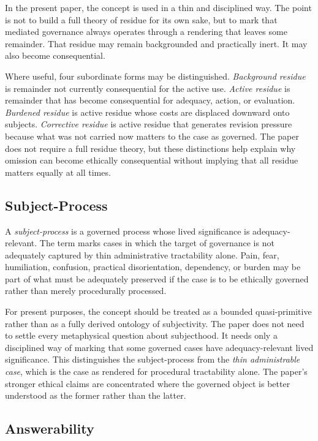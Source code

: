 \documentclass[11pt]{article}
\renewcommand{\emph}[1]{\textit{#1}}
\begin{document}
In the present paper, the concept is used in a thin and disciplined way. The point is not to build a full theory of residue for its own sake, but to mark that mediated governance always operates through a rendering that leaves some remainder. That residue may remain backgrounded and practically inert. It may also become consequential.

Where useful, four subordinate forms may be distinguished. \emph{Background residue} is remainder not currently consequential for the active use. \emph{Active residue} is remainder that has become consequential for adequacy, action, or evaluation. \emph{Burdened residue} is active residue whose costs are displaced downward onto subjects. \emph{Corrective residue} is active residue that generates revision pressure because what was not carried now matters to the case as governed. The paper does not require a full residue theory, but these distinctions help explain why omission can become ethically consequential without implying that all residue matters equally at all times.

\subsection{Subject-Process}

A \emph{subject-process} is a governed process whose lived significance is adequacy-relevant. The term marks cases in which the target of governance is not adequately captured by thin administrative tractability alone. Pain, fear, humiliation, confusion, practical disorientation, dependency, or burden may be part of what must be adequately preserved if the case is to be ethically governed rather than merely procedurally processed. \cite{Swanson2026EmbeddedProcess,Haraway1988SituatedKnowledges,Fricker2007EpistemicInjustice}

For present purposes, the concept should be treated as a bounded quasi-primitive rather than as a fully derived ontology of subjectivity. The paper does not need to settle every metaphysical question about subjecthood. It needs only a disciplined way of marking that some governed cases have adequacy-relevant lived significance. This distinguishes the subject-process from the \emph{thin administrable case}, which is the case as rendered for procedural tractability alone. The paper's stronger ethical claims are concentrated where the governed object is better understood as the former rather than the latter.

\subsection{Answerability}
\end{document}

